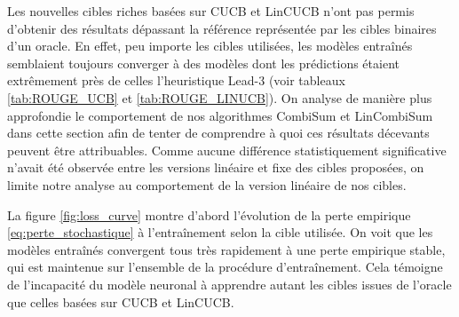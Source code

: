 Les nouvelles cibles riches basées sur CUCB et LinCUCB
n'ont pas permis d'obtenir des résultats dépassant 
la référence représentée par les cibles binaires d'un oracle.
En effet, peu importe les cibles utilisées, les modèles entraînés
semblaient toujours converger à des modèles dont les prédictions 
étaient extrêmement près de celles l'heuristique Lead-3 (voir tableaux \ref{tab:ROUGE_UCB} et \ref{tab:ROUGE_LINUCB}).
On analyse de manière plus approfondie le comportement de 
nos algorithmes CombiSum et LinCombiSum dans cette section afin 
de tenter de comprendre à quoi ces résultats décevants peuvent être 
attribuables.
Comme aucune différence statistiquement significative n'avait été observée
entre les versions linéaire et fixe des cibles proposées, on limite 
notre analyse au comportement de la version linéaire de nos cibles.

La figure \ref{fig:loss_curve} montre d'abord l'évolution de la perte 
empirique \eqref{eq:perte_stochastique} à l'entraînement selon la cible utilisée.
On voit que les modèles entraînés convergent tous très rapidement 
à une perte empirique stable, qui est maintenue sur l'ensemble de 
la procédure d'entraînement.
Cela témoigne de l'incapacité du modèle neuronal à apprendre 
autant les cibles issues de l'oracle que celles basées sur CUCB et LinCUCB.

